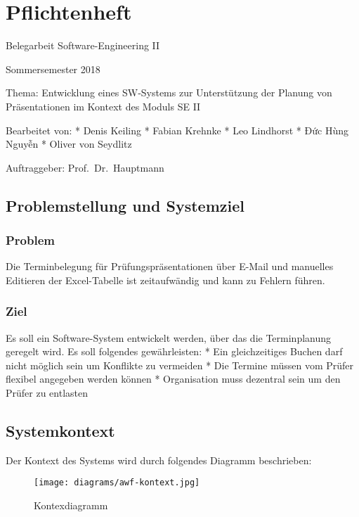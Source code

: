 \documentclass[]{article}
\date{}
\begin{document}
\hypertarget{pflichtenheft}{%
\section{Pflichtenheft}\label{pflichtenheft}}

Belegarbeit Software-Engineering II

Sommersemester 2018

Thema: Entwicklung eines SW‐Systems zur Unterstützung der Planung von
Präsentationen im Kontext des Moduls SE II

Bearbeitet von: * Denis Keiling * Fabian Krehnke * Leo Lindhorst * Đức
Hùng Nguyễn * Oliver von Seydlitz

Auftraggeber: Prof.~Dr.~Hauptmann

\hypertarget{problemstellung-und-systemziel}{%
\subsection{Problemstellung und
Systemziel}\label{problemstellung-und-systemziel}}

\hypertarget{problem}{%
\subsubsection{Problem}\label{problem}}

Die Terminbelegung für Prüfungspräsentationen über E-Mail und manuelles
Editieren der Excel-Tabelle ist zeitaufwändig und kann zu Fehlern
führen.

\hypertarget{ziel}{%
\subsubsection{Ziel}\label{ziel}}

Es soll ein Software-System entwickelt werden, über das die
Terminplanung geregelt wird. Es soll folgendes gewährleisten: * Ein
gleichzeitiges Buchen darf nicht möglich sein um Konflikte zu vermeiden
* Die Termine müssen vom Prüfer flexibel angegeben werden können *
Organisation muss dezentral sein um den Prüfer zu entlasten

\hypertarget{systemkontext}{%
\subsection{Systemkontext}\label{systemkontext}}

Der Kontext des Systems wird durch folgendes Diagramm beschrieben:

\begin{figure}
\centering
\texttt{[image: diagrams/awf-kontext.jpg]}
\caption{Kontexdiagramm}
\end{figure}
\end{document}

